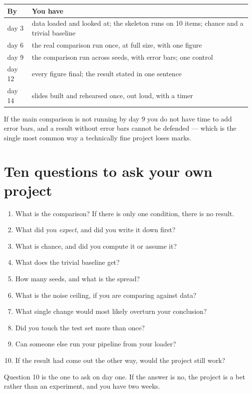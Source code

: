 \documentclass[11pt]{article}
\begin{document}
\begin{center}
\begin{tabular}{@{}ll@{}}
\toprule
By & You have \\
\midrule
day 3  & data loaded and looked at; the skeleton runs on 10 items; chance and a trivial baseline \\
day 6  & the real comparison run once, at full size, with one figure \\
day 9  & the comparison run across seeds, with error bars; one control \\
day 12 & every figure final; the result stated in one sentence \\
day 14 & slides built and rehearsed once, out loud, with a timer \\
\bottomrule
\end{tabular}
\end{center}

\begin{keybox}
 If the main comparison is
not running by day 9 you do not have time to add error bars, and a result without
error bars cannot be defended --- which is the single most common way a
technically fine project loses marks.
\end{keybox}

\section{Ten questions to ask your own project}

\begin{enumerate}
  \item What is the comparison? If there is only one condition, there is no result.
  \item What did you \emph{expect}, and did you write it down first?
  \item What is chance, and did you compute it or assume it?
  \item What does the trivial baseline get?
  \item How many seeds, and what is the spread?
  \item What is the noise ceiling, if you are comparing against data?
  \item What single change would most likely overturn your conclusion?
  \item Did you touch the test set more than once?
  \item Can someone else run your pipeline from your loader?
  \item If the result had come out the other way, would the project still work?
\end{enumerate}

Question 10 is the one to ask on day one. If the answer is no, the project is a
bet rather than an experiment, and you have two weeks.
\end{document}
